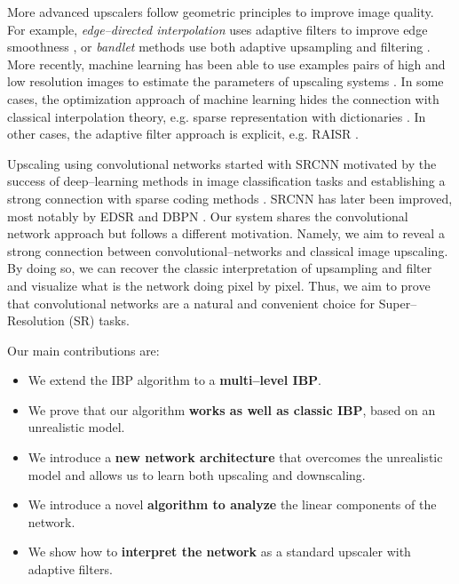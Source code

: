 \documentclass[letterpaper]{article}
\begin{document}
More advanced upscalers follow geometric principles to improve image quality. For example, \emph{edge--directed interpolation} uses adaptive filters to improve edge smoothness \cite{VRAlgazi_1991a,XLi_2001a}, or \emph{bandlet} methods use both adaptive upsampling and filtering \cite{SMallat_2007a}. More recently, machine learning has been able to use examples pairs of high and low resolution images to estimate the parameters of upscaling systems \cite{SCPark_2003a}. In some cases, the optimization approach of machine learning hides the connection with classical interpolation theory, e.g. sparse representation with dictionaries \cite{JYang_2008a,JYang_2010a}. In other cases, the adaptive filter approach is explicit, e.g. RAISR \cite{DBLP:journals/corr/RomanoIM16}.

Upscaling using convolutional networks started with SRCNN \cite{CDong_2014a,CDong_2015a} motivated by the success of deep--learning methods in image classification tasks \cite{YLeCun_2015a} and establishing a strong connection with sparse coding methods \cite{JYang_2008a,JYang_2010a}. SRCNN has later been improved, most notably by EDSR \cite{Lim_2017_CVPR_Workshops} and DBPN \cite{DBPN2018}. Our system shares the convolutional network approach but follows a different motivation. Namely, we aim to reveal a strong connection between convolutional--networks and classical image upscaling. By doing so, we can recover the classic interpretation of upsampling and filter and visualize what is the network doing pixel by pixel. Thus, we aim to prove that convolutional networks are a natural and convenient choice for Super--Resolution (SR) tasks.

Our main contributions are:
\begin{itemize}
    \item We extend the IBP algorithm to a \textbf{multi--level IBP}.
    \item We prove that our algorithm \textbf{works as well as classic IBP}, based on an unrealistic model.
    \item We introduce a \textbf{new network architecture} that overcomes the unrealistic model and allows us to learn both upscaling and downscaling.
    \item We introduce a novel \textbf{algorithm to analyze} the linear components of the network.
    \item We show how to \textbf{interpret the network} as a standard upscaler with adaptive filters.
\end{itemize}
\end{document}
